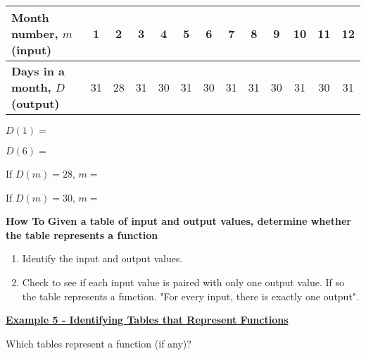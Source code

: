 \documentclass[12pt]{book}
\begin{document}
\begin{tabular}{ |l|c|c|c|c|c|c|c|c|c|c|c|c| } 
 \hline
 \textbf{Month number, $m$ (input)} & 1 & 2 & 3 & 4 & 5 & 6 & 7 & 8 & 9 & 10 & 11 & 12  \\ 
 \hline
 \textbf{Days in a month, $D$ (output)} & 31 & 28 & 31 & 30 & 31 & 30 & 31 & 31 & 30 & 31 & 30 & 31  \\ 
 \hline
\end{tabular}

\vspace{3mm}
$D(1)=$ \underline{ \hspace{20mm}}

$D(6)=$ \underline{ \hspace{20mm}}

If $D(m)=28$, $m=$ \underline{ \hspace{20mm}}

If $D(m)=30$, $m=$ \underline{ \hspace{30mm}}

\vspace{5mm}
\begin{boxR}
    \textbf{How To}
    \vspace{1mm}
    \hline
    \vspace{2mm}
    \textbf{Given a table of input and output values, determine whether the table represents a function}
    \begin{enumerate}
        \item Identify the input and output values.
        \item Check to see if each input value is paired with only one output value. If so the table represents a function. "For every input, there is exactly one output".
    \end{enumerate}
\end{boxR}

\vspace{1mm}


\underline{\textbf{Example 5 - Identifying Tables that Represent Functions}}

Which tables represent a function (if any)?
\end{document}
